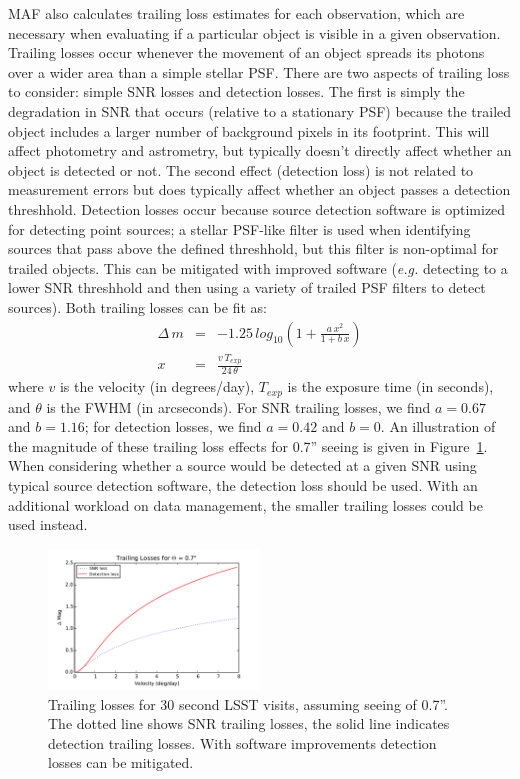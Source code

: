 MAF also calculates trailing loss estimates for each observation, which are necessary when evaluating if a particular object is visible in a given observation. Trailing losses occur whenever the movement of an object spreads its photons over a wider area than a simple stellar PSF. There are two aspects of trailing loss to consider: simple SNR losses and detection losses. The first is simply the degradation in SNR that occurs (relative to a stationary PSF) because the trailed object includes a larger number of background pixels in its footprint. This will affect photometry and astrometry, but typically doesn't directly affect whether an object is detected or not. The second effect (detection loss) is not related to measurement errors but does typically affect whether an object passes a detection threshhold. Detection losses occur because source detection software is optimized for detecting point sources; a stellar PSF-like filter is used when identifying sources that pass above the defined threshhold, but this filter is non-optimal for
trailed objects. This can be mitigated with improved software ({\it e.g.} detecting to a lower SNR threshhold and then using a variety of trailed PSF filters to detect sources). Both trailing losses can be fit as:
\begin{eqnarray}
\Delta \, m & = &-1.25 \, log_{10} \left( 1 + \frac{a \, x^2} { 1 + b\,
    x} \right) \\
x & = & \frac{v \, T_{exp}} {24 \, \theta} 
\end{eqnarray}
where $v$ is the velocity (in degrees/day), $T_{exp}$ is the exposure time (in seconds), and $\theta$ is the FWHM (in arcseconds). For SNR trailing losses, we find $a = 0.67$ and $b = 1.16$; for detection losses, we find $a=0.42$ and $b=0$. An illustration of the magnitude of these trailing loss effects for 0.7'' seeing is given in Figure~\ref{fig:trailinglosses}. When considering whether a source would be detected at a given SNR using typical source detection software, the detection loss should be used. With an additional workload on data management, the smaller trailing losses could be used instead.

\begin{figure}
\centering
\includegraphics[width=0.5\textwidth]{figures/trailing_losses}
\caption{Trailing losses for 30 second LSST visits, assuming seeing of
  0.7''. The dotted line shows SNR trailing losses, the solid line
  indicates  detection trailing losses. With software improvements
  detection losses can be mitigated.
\label{fig:trailinglosses}}
\end{figure}

